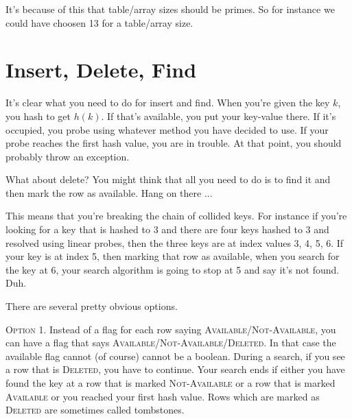 It's because of this that table/array sizes should be primes.
So for instance we 
could have choosen 13 for a table/array size.




\newpage
\section{Insert, Delete, Find}

It's clear what you need to do for insert and find.
When you're given the key $k$, you hash to get $h(k)$.
If that's available, you put your key-value there.
If it's occupied, you probe using whatever method you have decided to use.
If your probe reaches the first hash value, you are in trouble.
At that point, you should probably throw an exception.

What about delete?
You might think that all you need to do is to find it
and then mark the row as available.
Hang on there ...

This means that you're breaking the chain of collided keys.
For instance if you're looking for a key that is hashed to
3 and there are four keys hashed to 3 and resolved using linear 
probes, then the three keys are at index values 3, 4, 5, 6.
If your key is at index 5, then marking that row as available,
when you search for the key at 6, your search algorithm is
going to stop at 5 and say it's not found. Duh.

There are several pretty obvious options.

\textsc{Option 1.}
Instead of a flag for each row saying
\textsc{Available}/\textsc{Not-Available},
you can have a flag that says
\textsc{Available}/\textsc{Not-Available}/\textsc{Deleted}.
In that case the available flag cannot (of course) cannot be a boolean.
During a search, if you see a row that is \textsc{Deleted},
you have to continue.
Your search ends if either you have found the key at a row that is
marked \textsc{Not-Available} or a row that is marked
\textsc{Available} or you reached
your first hash value.
Rows which are marked as \textsc{Deleted} are sometimes called tombstones.

